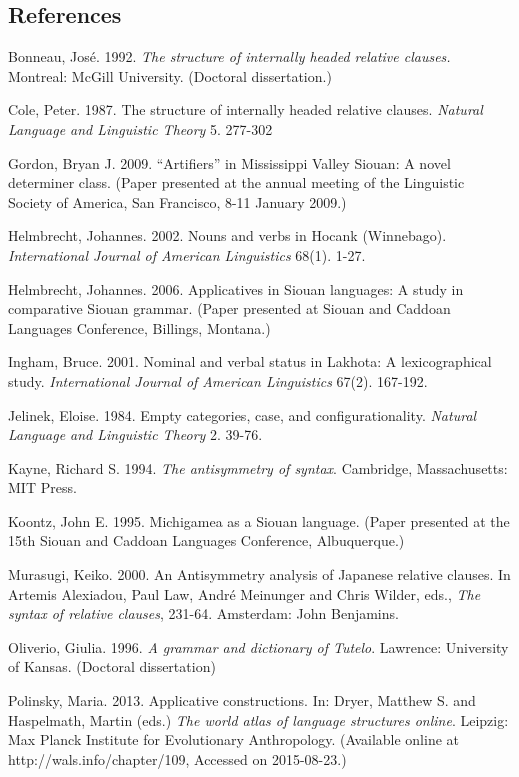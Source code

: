 \begin{refsection}
\section*{References}
 

\begin{reflist}

Bonneau, Jos\'e. 1992. \textit{The structure of internally headed relative clauses.} Montreal: McGill University. (Doctoral dissertation.) 

Cole, Peter. 1987. The structure of internally headed relative clauses. \textit{Natural Language and Linguistic Theory} 5. 277-302

Gordon, Bryan J. 2009. ``Artifiers'' in Mississippi Valley Siouan: A novel determiner class. (Paper presented at the annual meeting of the Linguistic Society of America, San Francisco, 8-11 January 2009.)

Helmbrecht, Johannes. 2002. Nouns and verbs in Hocank (Winnebago). \textit{International Journal of American Linguistics} 68(1). 1-27.

Helmbrecht, Johannes. 2006. Applicatives in Siouan languages: A study in comparative Siouan grammar. (Paper presented at Siouan and Caddoan Languages Conference, Billings, Montana.)

Ingham, Bruce. 2001. Nominal and verbal status in Lakhota: A lexicographical study. \textit{International Journal of American Linguistics} 67(2). 167-192.

Jelinek, Eloise. 1984. Empty categories, case, and configurationality. \textit{Natural Language and Linguistic Theory} 2. 39-76.

Kayne, Richard S. 1994. \textit{The antisymmetry of syntax}. Cambridge, Massachusetts: MIT Press.
                 
Koontz, John E. 1995. Michigamea as a Siouan language. (Paper presented at the 15th Siouan and Caddoan Languages Conference, Albuquerque.)

Murasugi, Keiko. 2000. An Antisymmetry analysis of Japanese relative clauses. In Artemis Alexiadou, Paul Law, Andr\'e Meinunger and Chris Wilder, eds., \textit{The syntax of relative clauses}, 231-64. Amsterdam: John Benjamins. 

Oliverio, Giulia. 1996. \textit{A grammar and dictionary of Tutelo}. Lawrence: University of Kansas. (Doctoral dissertation)

Polinsky, Maria. 2013. Applicative constructions. In: Dryer, Matthew S. and Haspelmath, Martin (eds.) \textit{The world atlas of language structures online}. Leipzig: Max Planck Institute for Evolutionary Anthropology. (Available online at http://wals.info/chapter/109, Accessed on 2015-08-23.)


\end{reflist}
\end{refsection}
